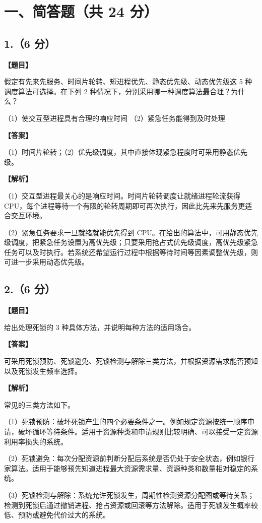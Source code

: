 \documentclass[UTF8,12pt]{ctexart}
\newenvironment{question}{\par\medskip\noindent\textbf{【题目】}\par\smallskip}{\par\medskip}
\newenvironment{explanation}{\par\noindent\textbf{【解析】}\par\smallskip}{\par\medskip}
\newenvironment{answer}{\par\noindent\textbf{【答案】}\par\smallskip}{\par}
\begin{document}
\section*{一、简答题（共 24 分）}

\subsection*{1.（6 分）}
\begin{question}
假定有先来先服务、时间片轮转、短进程优先、静态优先级、动态优先级这 5 种调度算法可选择。在下列 2 种情况下，分别采用哪一种调度算法最合理？为什么？

（1）使交互型进程具有合理的响应时间 （2）紧急任务能得到及时处理
\end{question}

\begin{answer}
（1）时间片轮转；（2）优先级调度，其中直接体现紧急程度时可采用静态优先级。
\end{answer}

\begin{explanation}
（1）交互型进程最关心的是响应时间。时间片轮转调度让就绪进程轮流获得 CPU，每个进程等待一个有限的轮转周期即可再次执行，因此比先来先服务更适合交互环境。

（2）紧急任务要求一旦就绪就能优先得到 CPU。在给出的算法中，可用静态优先级调度，把紧急任务设置为高优先级；只要采用抢占式优先级调度，高优先级紧急任务可以及时执行。若系统还希望运行过程中根据等待时间等因素调整优先级，则可进一步采用动态优先级。
\end{explanation}
\subsection*{2.（6 分）}
\begin{question}
给出处理死锁的 3 种具体方法，并说明每种方法的适用场合。
\end{question}

\begin{answer}
可采用死锁预防、死锁避免、死锁检测与解除三类方法，并根据资源需求能否预知以及死锁发生频率选择。
\end{answer}

\begin{explanation}
常见的三类方法如下。

（1）死锁预防：破坏死锁产生的四个必要条件之一。例如规定资源按统一顺序申请，破坏循环等待条件。适用于资源种类和申请规则比较明确、可以接受一定资源利用率损失的系统。

（2）死锁避免：每次分配资源前判断分配后系统是否仍处于安全状态，例如银行家算法。适用于能够预先知道进程最大资源需求量、资源种类和数量相对稳定的系统。

（3）死锁检测与解除：系统允许死锁发生，周期性检测资源分配图或等待关系；检测到死锁后通过撤销进程、抢占资源或回滚等方法解除。适用于死锁发生概率较低、预防或避免代价过大的系统。
\end{explanation}
\end{document}
